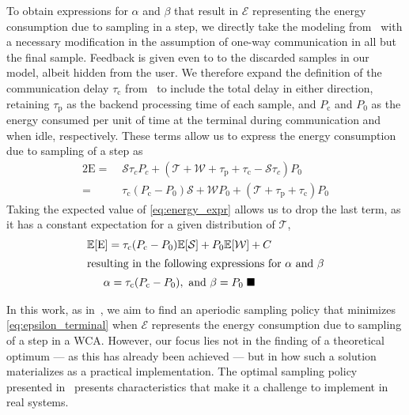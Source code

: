 To obtain expressions for \ensuremath{\alpha} and \ensuremath{\beta} that result in \ensuremath{\mathcal{E}} representing the energy consumption due to sampling in a step, we directly take the modeling from~\cite{moothedath2022energy2} with a necessary modification in the assumption of one-way communication in all but the final sample.
Feedback is given even to to the discarded samples in our model, albeit hidden from the user.
We therefore expand the definition of the communication delay \ensuremath{\tau_\text{c}} from~\cite{moothedath2022energy2} to include the total delay in either direction, retaining \ensuremath{\tau_\text{p}} as the backend processing time of each sample, and \( P_\text{c} \) and \( P_0 \) as the energy consumed per unit of time at the terminal during communication and when idle, respectively.
These terms allow us to express the energy consumption due to sampling of a step as
\begin{alignat}{2}
    \mathrm{E}=&\;\mathcal{S}\tau_cP_c+(\mathcal{T}+\mathcal{W}+\tau_\mathrm{p}+\tau_\mathrm{c}-\mathcal{S}\tau_c)P_0\nonumber\\
    =&\;\tau_{\text{c}}(P_{\text{c}} -P_0)\mathcal{S}+\mathcal{W}P_0+(\mathcal{T}+\tau_{\text{p}} +\tau_{\text{c}}) P_0\label{eq:energy_expr}
\end{alignat}
Taking the expected value of \cref{eq:energy_expr} allows us to drop the last term, as it has a constant expectation for a given distribution of \ensuremath{\mathcal{T}},
\begin{gather}
    \mathbb{E}[\mathrm{E}] = \tau_{\text{c}}(P_{\text{c}} - P_0)\mathbb{E}[\mathcal{S}]+P_0\mathbb{E}[\mathcal{W}]+ C\nonumber\\
    \intertext{resulting in the following expressions for \ensuremath{\alpha} and \ensuremath{\beta}}
    \alpha=\tau_{\text{c}}(P_{\text{c}} -P_0),\text{ and }\beta=P_0\;\blacksquare\nonumber
\end{gather}


In this work, as in~\cite{moothedath2022energy2}, we aim to find an aperiodic sampling policy that minimizes \cref{eq:epsilon_terminal} when \ensuremath{\mathcal{E}} represents the energy consumption due to sampling of a step in a \gls{WCA}.
However, our focus lies not in the finding of a theoretical optimum --- as this has already been achieved --- but in how such a solution materializes as a practical implementation.
The optimal sampling policy presented in~\cite{moothedath2022energy2} presents characteristics that make it a challenge to implement in real systems.





